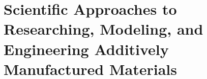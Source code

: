 \chapter{Scientific Approaches to Researching, Modeling, and Engineering Additively Manufactured Materials}





